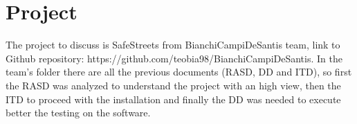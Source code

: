 \section{Project}

The project to discuss is SafeStreets from BianchiCampiDeSantis team, link to Github repository:
https://github.com/teobia98/BianchiCampiDeSantis.
In the team's folder there are all the previous documents (RASD, DD and ITD), so first the RASD was analyzed to understand the project with an high view, then the ITD to proceed with the installation and finally the DD was needed to execute better the testing on the software.
